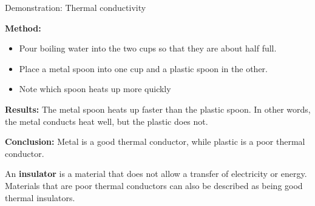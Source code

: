 \begin{g_experiment}{Demonstration: Thermal conductivity}
{\begin{minipage}{.5\textwidth}
\end{minipage}
      \label{m38706*id66592}\textbf{Method:}
\label{m38706*id66609}\begin{itemize}[noitemsep]
\label{m38706*uid102}\item Pour boiling water into the two cups so that they are about half full.
\label{m38706*uid103}\item Place a metal spoon into one cup and a plastic spoon in the other.
\label{m38706*uid104}\item Note which spoon heats up more quickly
\end{itemize}
        \par 
\label{m38706*eip-270}
	\par
      \label{m38706*id66666}\noindent{}\textbf{Results: }\newline
    The metal spoon heats up faster than the plastic spoon. In other words, the metal conducts heat well, but the plastic does not.\par 
\label{m38706*id66687}\noindent{}\textbf{Conclusion: }Metal is a good thermal conductor, while plastic is a poor thermal conductor.}
\end{g_experiment}
 \par 
      \label{m38706*id66699}An \textbf{insulator} is a material that does not allow a transfer of electricity or energy. Materials that are poor thermal conductors can also be described as being good thermal insulators.\par 

